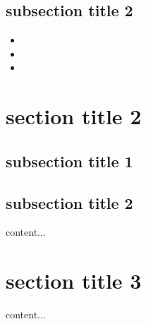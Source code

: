 \documentclass{beamer}
\begin{document}
\subsection{subsection title 2}
\begin{frame}
\begin{itemize}
	\item 
	\item 
	\item 
\end{itemize}
\end{frame}

\section{section title 2}
\subsection{subsection title 1}
\begin{frame}
\end{frame}

\subsection{subsection title 2}
\begin{frame}
	content...
\end{frame}

\section{section title 3}
\begin{frame}
	content...
\end{frame}
\end{document}
